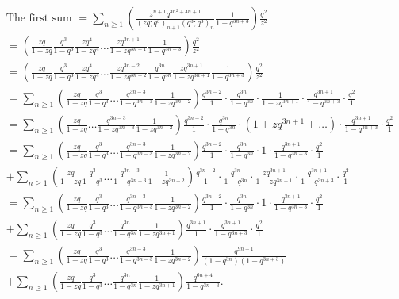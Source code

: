 \documentclass[draft]{amsart}
\numberwithin{equation}{section}
\theoremstyle{plain}
\theoremstyle{remark}
\begin{document}
\begin{align*}%
&\mbox{The first sum }=\sum_{n\geq 1}\left(\frac{z^{n+1}q^{3n^{2}+4n+1}}{(zq;q^{3})_{n+1}(q^{3};q^{3})_{n}}\frac{1}{1-q^{3n+3}}\right)\frac{q^{2}}{z^{2}}\\
&=\left(\frac{zq}{1-zq}\frac{q^{3}}{1-q^{3}}\frac{zq^{4}}{1-zq^{4}}\dots\frac{zq^{3n+1}}{1-zq^{3n+1}}\frac{1}{1-q^{3n+3}}    \right)\frac{q^{2}}{z^{2}}\\
&=\left(\frac{zq}{1-zq}\frac{q^{3}}{1-q^{3}}\frac{zq^{4}}{1-zq^{4}}\dots\frac{zq^{3n-2}}{1-zq^{3n-2}}\frac{q^{3n}}{1-q^{3n}}\frac{zq^{3n+1}}{1-zq^{3n+1}}\frac{1}{1-q^{3n+3}}    \right)\frac{q^{2}}{z^{2}}\\
&=\sum_{n\geq 1}\left(\frac{zq}{1-zq}\frac{q^{3}}{1-q^{3}}\dots\frac{q^{3n-3}}{1-q^{3n-3}}\frac{1}{1-zq^{3n-2}}\right)\frac{q^{3n-2}}{1}\cdot\frac{q^{3n}}{1-q^{3n}}\cdot\frac{1}{1-zq^{3n+1}}\cdot\frac{q^{3n+1}}{1-q^{3n+3}}\cdot\frac{q^{2}}{1}\\
&=\sum_{n\geq 1}\left(\frac{zq}{1-zq}\dots\frac{q^{3n-3}}{1-zq^{3n-3}}\frac{1}{1-zq^{3n-2}}\right)\frac{q^{3n-2}}{1}\cdot\frac{q^{3n}}{1-q^{3n}}\cdot(1+zq^{3n+1}+\dots)\cdot\frac{q^{3n+1}}{1-q^{3n+3}}\cdot\frac{q^{2}}{1}\\
&=\sum_{n\geq 1}\left(\frac{zq}{1-zq}\frac{q^{3}}{1-q^{3}}\dots\frac{q^{3n-3}}{1-q^{3n-3}}\frac{1}{1-zq^{3n-2}}\right)\frac{q^{3n-2}}{1}\cdot\frac{q^{3n}}{1-q^{3n}}\cdot1\cdot\frac{q^{3n+1}}{1-q^{3n+3}}\cdot\frac{q^{2}}{1}\\
&+\sum_{n\geq 1}\left(\frac{zq}{1-zq}\frac{q^{3}}{1-q^{3}}\dots\frac{q^{3n-3}}{1-q^{3n-3}}\frac{1}{1-zq^{3n-2}}\right)\frac{q^{3n-2}}{1}\cdot\frac{q^{3n}}{1-q^{3n}}\cdot\frac{zq^{3n+1}}{1-zq^{3n+1}}\cdot\frac{q^{3n+1}}{1-q^{3n+3}}\cdot\frac{q^{2}}{1}\\
&=\sum_{n\geq 1}\left(\frac{zq}{1-zq}\frac{q^{3}}{1-q^{3}}\dots\frac{q^{3n-3}}{1-q^{3n-3}}\frac{1}{1-zq^{3n-2}}\right)\frac{q^{3n-2}}{1}\cdot\frac{q^{3n}}{1-q^{3n}}\cdot1\cdot\frac{q^{3n+1}}{1-q^{3n+3}}\cdot\frac{q^{2}}{1}\\
&+\sum_{n\geq 1}\left(\frac{zq}{1-zq}\frac{q^{3}}{1-q^{3}}\dots\frac{q^{3n}}{1-q^{3n}}\frac{1}{1-zq^{3n+1}}\right)\frac{q^{3n+1}}{1}\cdot\frac{q^{3n+1}}{1-q^{3n+3}}\cdot\frac{q^{2}}{1}\\
&=\sum_{n\geq 1}\left(\frac{zq}{1-zq}\frac{q^{3}}{1-q^{3}}\dots\frac{q^{3n-3}}{1-q^{3n-3}}\frac{1}{1-zq^{3n-2}}\right)\frac{q^{9n+1}}{(1-q^{3n})(1-q^{3n+3})}       \\
&+\sum_{n\geq 1}\left(\frac{zq}{1-zq}\frac{q^{3}}{1-q^{3}}\dots\frac{q^{3n}}{1-q^{3n}}\frac{1}{1-zq^{3n+1}}\right)\frac{q^{6n+4}}{1-q^{3n+3}}. 
\end{align*}
\end{document}

